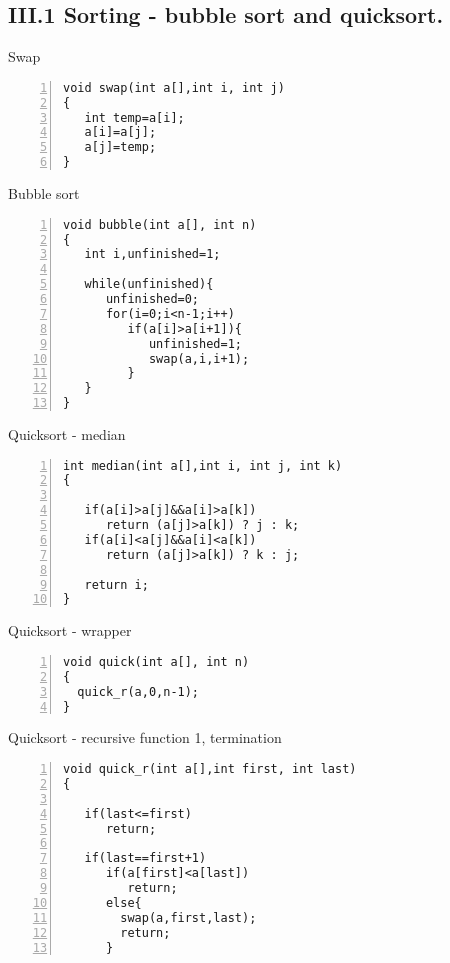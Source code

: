 \documentclass{beamer}
\begin{document}
\subsection*{III.1 Sorting - bubble sort and quicksort.}
\begin{frame}[fragile]{Swap}
\begin{lstlisting}[numbers=left]
void swap(int a[],int i, int j)
{
   int temp=a[i];
   a[i]=a[j];
   a[j]=temp;
}
\end{lstlisting}
\end{frame}

\begin{frame}[fragile]{Bubble sort}
\begin{lstlisting}[numbers=left]
void bubble(int a[], int n)
{
   int i,unfinished=1;
  
   while(unfinished){
      unfinished=0;
      for(i=0;i<n-1;i++)
         if(a[i]>a[i+1]){
            unfinished=1;
            swap(a,i,i+1);	    
         }
   }
}
\end{lstlisting}
\end{frame}

\begin{frame}[fragile]{Quicksort - median}
\begin{lstlisting}[numbers=left]
int median(int a[],int i, int j, int k)
{

   if(a[i]>a[j]&&a[i]>a[k])
      return (a[j]>a[k]) ? j : k;
   if(a[i]<a[j]&&a[i]<a[k])
      return (a[j]>a[k]) ? k : j;

   return i;
}
\end{lstlisting}
\end{frame}



\begin{frame}[fragile]{Quicksort - wrapper}
\begin{lstlisting}[numbers=left]
void quick(int a[], int n)
{
  quick_r(a,0,n-1);
}
\end{lstlisting}
\end{frame}

\begin{frame}[fragile]{Quicksort - recursive function 1, termination}
\begin{lstlisting}[numbers=left]
void quick_r(int a[],int first, int last)
{

   if(last<=first)
      return;

   if(last==first+1)
      if(a[first]<a[last])
         return;
      else{
        swap(a,first,last);
        return;
      }
\end{lstlisting}
\end{frame}
\end{document}
